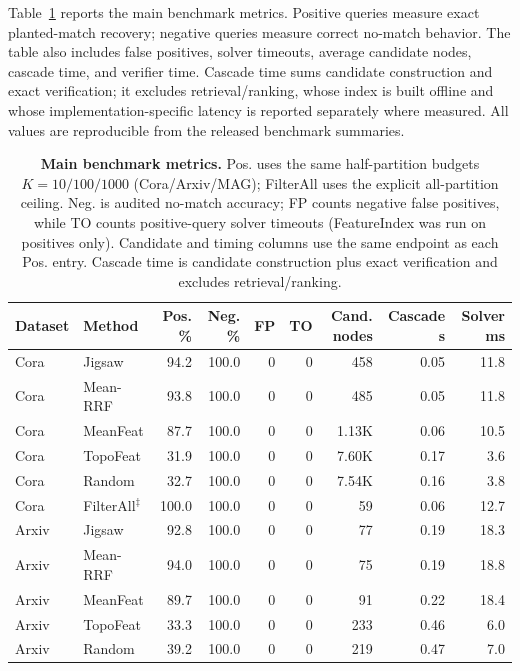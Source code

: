 \documentclass{article}
\begin{document}
Table~\ref{tab:production_matrix} reports the main benchmark metrics. Positive queries measure exact planted-match recovery; negative queries measure correct no-match behavior. The table also includes false positives, solver timeouts, average candidate nodes, cascade time, and verifier time. Cascade time sums candidate construction and exact verification; it excludes retrieval/ranking, whose index is built offline and whose implementation-specific latency is reported separately where measured. All values are reproducible from the released benchmark summaries.

\begin{table}[t]
\centering
\caption{\textbf{Main benchmark metrics.} Pos. uses the same half-partition budgets $K{=}10/100/1000$ (Cora/Arxiv/MAG); FilterAll uses the explicit all-partition ceiling. Neg. is audited no-match accuracy; FP counts negative false positives, while TO counts positive-query solver timeouts (FeatureIndex was run on positives only). Candidate and timing columns use the same endpoint as each Pos. entry. Cascade time is candidate construction plus exact verification and excludes retrieval/ranking.}
\label{tab:production_matrix}
\scriptsize
\setlength{\tabcolsep}{2.5pt}
\begin{tabular}{llrrrrrrr}
\toprule
\textbf{Dataset} & \textbf{Method} & \textbf{Pos. \%} & \textbf{Neg. \%} & \textbf{FP} & \textbf{TO} & \textbf{Cand. nodes} & \textbf{Cascade s} & \textbf{Solver ms} \\
\midrule
Cora & Jigsaw & 94.2 & 100.0 & 0 & 0 & 458 & 0.05 & 11.8 \\
Cora & Mean-RRF & 93.8 & 100.0 & 0 & 0 & 485 & 0.05 & 11.8 \\
Cora & MeanFeat & 87.7 & 100.0 & 0 & 0 & 1.13K & 0.06 & 10.5 \\
Cora & TopoFeat & 31.9 & 100.0 & 0 & 0 & 7.60K & 0.17 & 3.6 \\
Cora & Random & 32.7 & 100.0 & 0 & 0 & 7.54K & 0.16 & 3.8 \\
Cora & FilterAll$^\ddagger$ & 100.0 & 100.0 & 0 & 0 & 59 & 0.06 & 12.7 \\
\midrule
Arxiv & Jigsaw & 92.8 & 100.0 & 0 & 0 & 77 & 0.19 & 18.3 \\
Arxiv & Mean-RRF & 94.0 & 100.0 & 0 & 0 & 75 & 0.19 & 18.8 \\
Arxiv & MeanFeat & 89.7 & 100.0 & 0 & 0 & 91 & 0.22 & 18.4 \\
Arxiv & TopoFeat & 33.3 & 100.0 & 0 & 0 & 233 & 0.46 & 6.0 \\
Arxiv & Random & 39.2 & 100.0 & 0 & 0 & 219 & 0.47 & 7.0 \\

\end{tabular}
\end{table}
\end{document}
